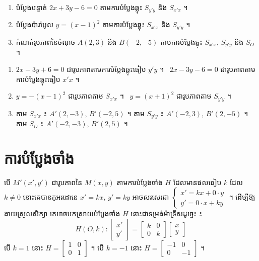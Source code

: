 \begin{pro}
\begin{enumerate}[a]
  \item បំប្លែងបន្ទាត់ $2x + 3y - 6 = 0$ តាមការបំប្លែងឆ្លុះ $S_{y'y}$ និង $S_{x'x}$ ។
  \item បំប្លែងប៉ារ៉ាបូល $y = (x - 1)^2$ តាមការបំប្លែងឆ្លុះ $S_{x'x}$ និង $S_{y'y}$ ។
  \item កំណត់រូបភាពនៃចំណុច $A(2, 3)$ និង $B(-2, -5)$ តាមការបំប្លែងឆ្លុះ $S_{x'x}$, $S_{y'y}$ និង $S_O$ ។
\end{enumerate}
\ans
\begin{enumerate}[a]
  \item $2x - 3y + 6 = 0$ ជារូបភាពតាមការបំប្លែងឆ្លុះធៀប $y'y$ ។ \ $2x - 3y - 6 = 0$ ជារូបភាពតាមការបំប្លែងឆ្លុះធៀប $x'x$ ។
  \item $y = -(x - 1)^2$ ជារូបភាពតាម $S_{x'x}$ ។ \ $y = (x + 1)^2$ ជារូបភាពតាម $S_{y'y}$ ។
  \item តាម $S_{x'x}$ ៖ $A'(2, -3)$, $B'(-2, 5)$ ។ តាម $S_{y'y}$ ៖ $A'(-2, 3)$, $B'(2, -5)$ ។ តាម $S_O$ ៖ $A'(-2, -3)$, $B'(2, 5)$ ។
\end{enumerate}
\end{pro}

\section{ការបំប្លែងចាំង}

បើ $M'(x', y')$ ជារូបភាពនៃ $M(x, y)$ តាមការបំប្លែងចាំង $H$ ដែលមានផលធៀប $k$ ដែល $k \ne 0$ នោះគេបានកូអរដោនេ $x' = kx$, $y' = ky$ អាចសរសេរជា $\begin{cases} x' = kx + 0\cdot y\\ y' = 0\cdot x + ky \end{cases}$ ។ ដើម្បីឱ្យងាយស្រួលសិក្សា គេអាចបកស្រាយបំប្លែងចាំង $H$ នោះជាទម្រង់ម៉ាទ្រីសដូច្នេះ ៖
\[ H(O, k) : \begin{bmatrix} x'\\ y' \end{bmatrix} = \begin{bmatrix} k & 0\\ 0 & k \end{bmatrix}\begin{bmatrix} x\\ y \end{bmatrix} \]
បើ $k = 1$ នោះ $H = \begin{bmatrix} 1 & 0\\ 0 & 1 \end{bmatrix}$ ។ បើ $k = -1$ នោះ $H = \begin{bmatrix} -1 & 0\\ 0 & -1 \end{bmatrix}$ ។

